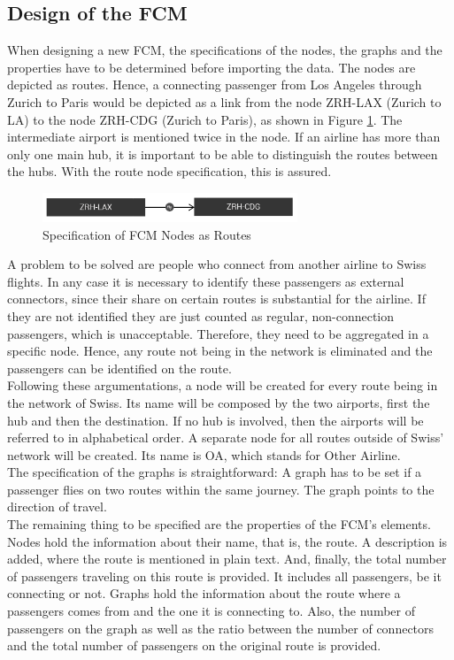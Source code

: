 \documentclass[conference]{IEEEtran}
\begin{document}
\subsection{Design of the FCM}
When designing a new FCM, the specifications of the nodes, the graphs and the properties have to be determined before importing the data. The nodes are depicted as routes. Hence, a connecting passenger from Los Angeles through Zurich to Paris would be depicted as a link from the node ZRH-LAX (Zurich to LA) to the node ZRH-CDG (Zurich to Paris), as shown in Figure \ref{fig:noderoute}. The intermediate airport is mentioned twice in the node. If an airline has more than only one main hub, it is important to be able to distinguish the routes between the hubs. With the route node specification, this is assured.
\begin{figure}[h]
\includegraphics[width=3in]{img/route.png}
\caption{Specification of FCM Nodes as Routes}
\label{fig:noderoute}
\end{figure}
A problem to be solved are people who connect from another airline to Swiss flights. In any case it is necessary to identify these passengers as external connectors, since their share on certain routes is substantial for the airline. If they are not identified they are just counted as regular, non-connection passengers, which is unacceptable. Therefore, they need to be aggregated in a specific node. Hence, any route not being in the network is eliminated and the passengers can be identified on the route.\\
Following these argumentations, a node will be created for every route being in the network of Swiss. Its name will be composed by the two airports, first the hub and then the destination. If no hub is involved, then the airports will be referred to in alphabetical order. A separate node for all routes outside of Swiss' network will be created. Its name is OA, which stands for Other Airline.\\
The specification of the graphs is straightforward: A graph has to be set if a passenger flies on two routes within the same journey. The graph points to the direction of travel.\\
The remaining thing to be specified are the properties of the FCM's elements. Nodes hold the information about their name, that is, the route. A description is added, where the route is mentioned in plain text. And, finally, the total number of passengers traveling on this route is provided. It includes all passengers, be it connecting or not. Graphs hold the information about the route where a passengers comes from and the one it is connecting to. Also, the number of passengers on the graph as well as the ratio between the number of connectors and the total number of passengers on the original route is provided.\\
\end{document}
